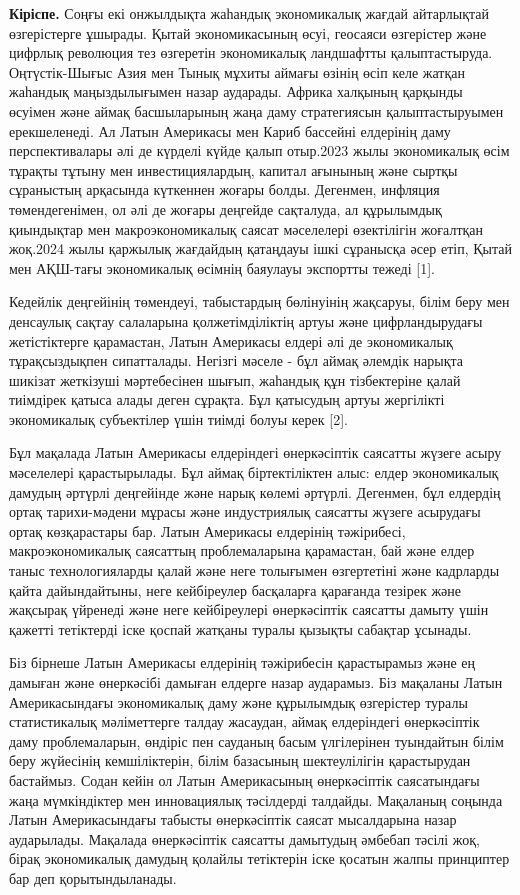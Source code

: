 \begin{multicols}{2}
{\bfseries Кіріспе.} Соңғы екі онжылдықта жаһандық экономикалық жағдай
айтарлықтай өзгерістерге ұшырады. Қытай экономикасының өсуі, геосаяси
өзгерістер және цифрлық революция тез өзгеретін экономикалық ландшафтты
қалыптастыруда. Оңтүстік-Шығыс Азия мен Тынық мұхиты аймағы өзінің өсіп
келе жатқан жаһандық маңыздылығымен назар аударады. Африка халқының
қарқынды өсуімен және аймақ басшыларының жаңа даму стратегиясын
қалыптастыруымен ерекшеленеді. Ал Латын Америкасы мен Кариб бассейні
елдерінің даму перспективалары әлі де күрделі күйде қалып отыр.2023
жылы экономикалық өсім тұрақты тұтыну мен инвестициялардың, капитал
ағынының және сыртқы сұраныстың арқасында күткеннен жоғары болды.
Дегенмен, инфляция төмендегенімен, ол әлі де жоғары деңгейде сақталуда,
ал құрылымдық қиындықтар мен макроэкономикалық саясат мәселелері
өзектілігін жоғалтқан жоқ.2024 жылы қаржылық жағдайдың қатаңдауы ішкі
сұранысқа әсер етіп, Қытай мен АҚШ-тағы экономикалық өсімнің баяулауы
экспортты тежеді {[}1{]}.

Кедейлік деңгейінің төмендеуі, табыстардың бөлінуінің жақсаруы, білім
беру мен денсаулық сақтау салаларына қолжетімділіктің артуы және
цифрландырудағы жетістіктерге қарамастан, Латын Америкасы елдері әлі де
экономикалық тұрақсыздықпен сипатталады. Негізгі мәселе - бұл аймақ
әлемдік нарықта шикізат жеткізуші мәртебесінен шығып, жаһандық құн
тізбектеріне қалай тиімдірек қатыса алады деген сұрақта. Бұл қатысудың
артуы жергілікті экономикалық субъектілер үшін тиімді болуы керек
{[}2{]}.

Бұл мақалада Латын Америкасы елдеріндегі өнеркәсіптік саясатты жүзеге
асыру мәселелері қарастырылады. Бұл аймақ біртектіліктен алыс: елдер
экономикалық дамудың әртүрлі деңгейінде және нарық көлемі әртүрлі.
Дегенмен, бұл елдердің ортақ тарихи-мәдени мұрасы және индустриялық
саясатты жүзеге асырудағы ортақ көзқарастары бар. Латын Америкасы
елдерінің тәжірибесі, макроэкономикалық саясаттың проблемаларына
қарамастан, бай және елдер таныс технологияларды қалай және неге
толығымен өзгертетіні және кадрларды қайта дайындайтыны, неге
кейбіреулер басқаларға қарағанда тезірек және жақсырақ үйренеді және
неге кейбіреулері өнеркәсіптік саясатты дамыту үшін қажетті тетіктерді
іске қоспай жатқаны туралы қызықты сабақтар ұсынады.

Біз бірнеше Латын Америкасы елдерінің тәжірибесін қарастырамыз және ең
дамыған және өнеркәсібі дамыған елдерге назар аударамыз. Біз мақаланы
Латын Америкасындағы экономикалық даму және құрылымдық өзгерістер туралы
статистикалық мәліметтерге талдау жасаудан, аймақ елдеріндегі
өнеркәсіптік даму проблемаларын, өндіріс пен сауданың басым үлгілерінен
туындайтын білім беру жүйесінің кемшіліктерін, білім базасының
шектеулілігін қарастырудан бастаймыз. Содан кейін ол Латын Америкасының
өнеркәсіптік саясатындағы жаңа мүмкіндіктер мен инновациялық тәсілдерді
талдайды. Мақаланың соңында Латын Америкасындағы табысты өнеркәсіптік
саясат мысалдарына назар аударылады. Мақалада өнеркәсіптік саясатты
дамытудың әмбебап тәсілі жоқ, бірақ экономикалық дамудың қолайлы
тетіктерін іске қосатын жалпы принциптер бар деп қорытындыланады.


\end{multicols}
